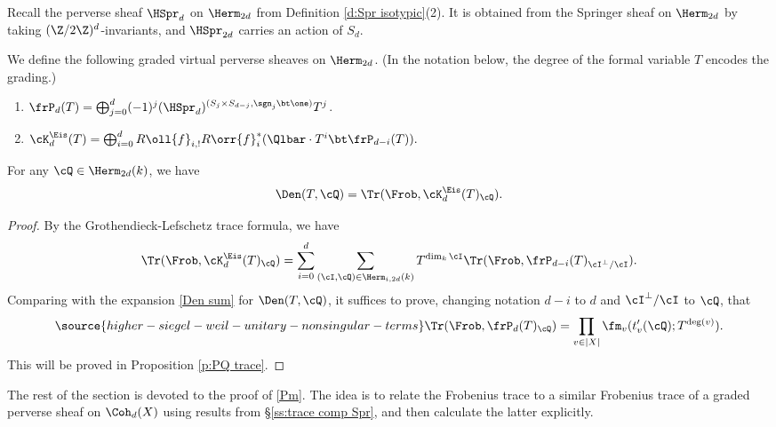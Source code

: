 Recall the perverse sheaf $\HSpr_{d}$ on $\Herm_{2d}$ from Definition \ref{d:Spr isotypic}(2). It is obtained from the Springer sheaf on $\Herm_{2d}$ by taking $(\Z/2\Z)^{d}$-invariants, and $\HSpr_{2d}$ carries an action of $S_{d}$.

\begin{defn}
\notready\label{def: K_Eis} We define the following graded virtual perverse sheaves on $\Herm_{2d}$. (In the notation below, the degree of the formal variable $T$ encodes the grading.)
\begin{enumerate}
\item $\frP_{d}(T)=\bigoplus_{j=0}^{d}(-1)^{j}(\HSpr_{d})^{(S_{j}\times S_{d-j}, \sgn_{j}\bt \one)}T^{j}$.
\item $\cK^{\Eis}_{d}(T)=\bigoplus_{i=0}^{d} R\oll{f}_{i,!}R\orr{f}^{*}_{i}(\Qlbar\cdot T^{i}\bt \frP_{d-i}(T)).$
\end{enumerate}
\end{defn}


\begin{thm}
\notready\label{th:Den Wd} For any $\cQ\in \Herm_{2d}(k)$, we have
\begin{equation*}
\Den(T,\cQ)=\Tr(\Frob, \cK^{\Eis}_{d}(T)_{\cQ}).
\end{equation*}
\end{thm}
\begin{proof}
By the Grothendieck-Lefschetz trace formula, we have
\begin{equation*}
\Tr(\Frob, \cK^{\Eis}_{d}(T)_{\cQ})= \sum_{i=0}^d \sum_{(\cI,\cQ)\in \Herm_{i,2d}(k)}T^{\dim_{k}\cI}\Tr(\Frob, \frP_{d-i}(T)_{\cI^{\bot}/\cI}).
\end{equation*}
Comparing with the expansion \eqref{Den sum} for $\Den(T,\cQ)$, it suffices to prove, changing notation $d-i$ to $d$ and $\cI^{\bot}/\cI$ to $\cQ$, that
\begin{equation}\label{Pm}
\source{higher-siegel-weil-unitary-nonsingular-terms}
\Tr(\Frob, \frP_{d}(T)_{\cQ})=\prod_{v\in |X|}\fm_{v}(t'_{v}(\cQ);T^{\deg(v)}).
\end{equation}
This will be proved in Proposition \ref{p:PQ trace}.
\end{proof}

The rest of the section is devoted to the proof of \eqref{Pm}. The idea is to relate the Frobenius trace to a similar Frobenius trace of a graded perverse sheaf on $\Coh_{d}(X)$ using results from \S\ref{ss:trace comp Spr}, and then calculate the latter explicitly.


